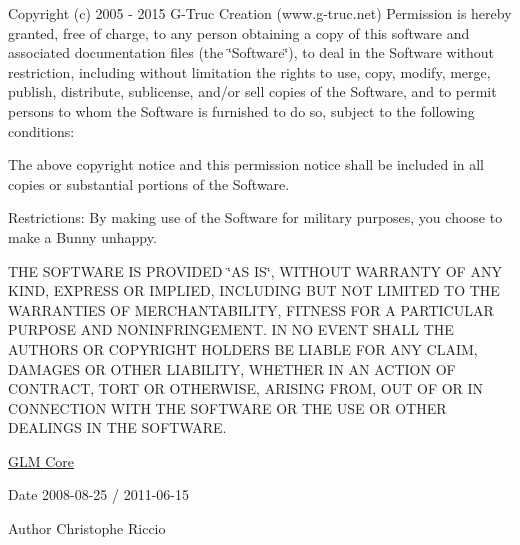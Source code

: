 Copyright (c) 2005 -\/ 2015 G-\/\-Truc Creation (www.\-g-\/truc.\-net) Permission is hereby granted, free of charge, to any person obtaining a copy of this software and associated documentation files (the \char`\"{}\-Software\char`\"{}), to deal in the Software without restriction, including without limitation the rights to use, copy, modify, merge, publish, distribute, sublicense, and/or sell copies of the Software, and to permit persons to whom the Software is furnished to do so, subject to the following conditions\-:

The above copyright notice and this permission notice shall be included in all copies or substantial portions of the Software.

Restrictions\-: By making use of the Software for military purposes, you choose to make a Bunny unhappy.

T\-H\-E S\-O\-F\-T\-W\-A\-R\-E I\-S P\-R\-O\-V\-I\-D\-E\-D \char`\"{}\-A\-S I\-S\char`\"{}, W\-I\-T\-H\-O\-U\-T W\-A\-R\-R\-A\-N\-T\-Y O\-F A\-N\-Y K\-I\-N\-D, E\-X\-P\-R\-E\-S\-S O\-R I\-M\-P\-L\-I\-E\-D, I\-N\-C\-L\-U\-D\-I\-N\-G B\-U\-T N\-O\-T L\-I\-M\-I\-T\-E\-D T\-O T\-H\-E W\-A\-R\-R\-A\-N\-T\-I\-E\-S O\-F M\-E\-R\-C\-H\-A\-N\-T\-A\-B\-I\-L\-I\-T\-Y, F\-I\-T\-N\-E\-S\-S F\-O\-R A P\-A\-R\-T\-I\-C\-U\-L\-A\-R P\-U\-R\-P\-O\-S\-E A\-N\-D N\-O\-N\-I\-N\-F\-R\-I\-N\-G\-E\-M\-E\-N\-T. I\-N N\-O E\-V\-E\-N\-T S\-H\-A\-L\-L T\-H\-E A\-U\-T\-H\-O\-R\-S O\-R C\-O\-P\-Y\-R\-I\-G\-H\-T H\-O\-L\-D\-E\-R\-S B\-E L\-I\-A\-B\-L\-E F\-O\-R A\-N\-Y C\-L\-A\-I\-M, D\-A\-M\-A\-G\-E\-S O\-R O\-T\-H\-E\-R L\-I\-A\-B\-I\-L\-I\-T\-Y, W\-H\-E\-T\-H\-E\-R I\-N A\-N A\-C\-T\-I\-O\-N O\-F C\-O\-N\-T\-R\-A\-C\-T, T\-O\-R\-T O\-R O\-T\-H\-E\-R\-W\-I\-S\-E, A\-R\-I\-S\-I\-N\-G F\-R\-O\-M, O\-U\-T O\-F O\-R I\-N C\-O\-N\-N\-E\-C\-T\-I\-O\-N W\-I\-T\-H T\-H\-E S\-O\-F\-T\-W\-A\-R\-E O\-R T\-H\-E U\-S\-E O\-R O\-T\-H\-E\-R D\-E\-A\-L\-I\-N\-G\-S I\-N T\-H\-E S\-O\-F\-T\-W\-A\-R\-E.

\hyperlink{group__core}{G\-L\-M Core}

\begin{DoxyDate}{Date}
2008-\/08-\/25 / 2011-\/06-\/15 
\end{DoxyDate}
\begin{DoxyAuthor}{Author}
Christophe Riccio 
\end{DoxyAuthor}
